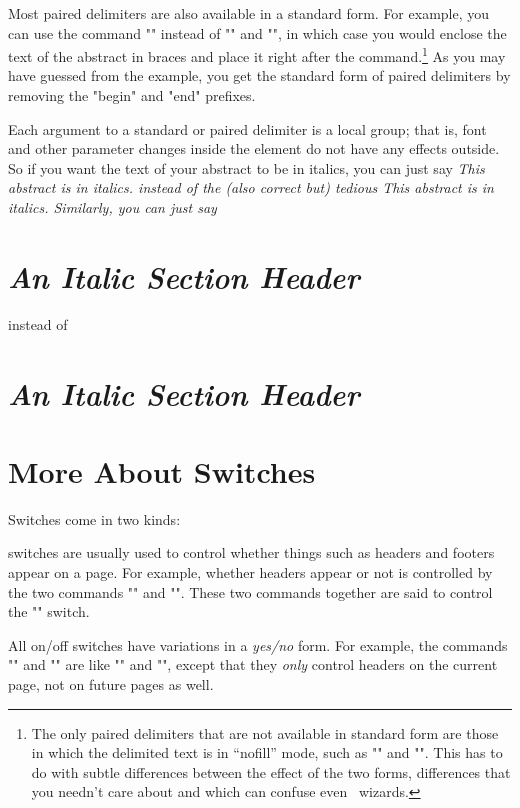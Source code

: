 \endbullets

Most paired delimiters are also available in a standard form.
For example, you can use the command "\abstract" instead of
"\beginabstract" and "\endabstract", in which case you would
enclose the text of the abstract in braces and place it right
after the command.\footnote*{The only paired delimiters that are
not available in standard form are those in which the delimited
text is in ``nofill'' mode, such as "\beginverbatim" and
"\endverbatim".  This has to do with subtle differences between
the effect of the two forms, differences that you needn't care
about and which can confuse even \tex\ wizards.}  As you may have
guessed from the example, you get the standard form of paired
delimiters by removing the "begin" and "end" prefixes.

Each argument to a standard or paired delimiter is a local group;
that is, font and other parameter changes inside the element do
not have any effects outside.  So if you want the text of your
abstract to be in italics, you can just say
\beginverb
\beginabstract
\it This abstract is in italics.
\endabstract
\endverb
instead of the (also correct but) tedious
\beginverb
\beginabstract
{\it This abstract is in italics.}
\endabstract
\endverb
Similarly, you can just say
\beginverb
\section {\it An Italic Section Header}
\endverb
instead of
\beginverb
\section {{\it An Italic Section Header}}
\endverb

\section {More About Switches}

Switches come in two kinds:

 switches are usually used to control whether
things such as headers and footers appear on a page.
For example, whether headers appear or not is controlled by the
two commands "\onheaders" and "\offheaders".  These two commands
together are said to control the "\headers" switch.

\vpar All on/off switches have variations in a {\it yes/no} form.
For example, the commands "\yesheaders" and "\noheaders" are like
"\onheaders" and "\offheaders", except that they {\it only}
control headers on the current page, not on future pages as well.

